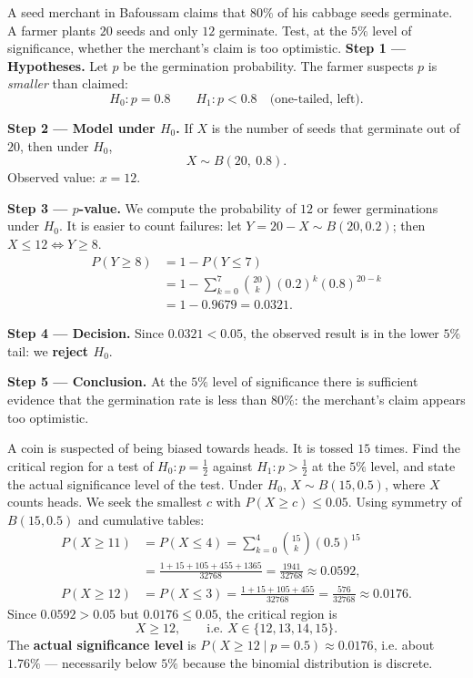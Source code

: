 \documentclass[11pt]{article}
\begin{document}
\begin{exoresolu}
A seed merchant in Bafoussam claims that $80\%$ of his cabbage seeds germinate. A farmer plants $20$ seeds and only $12$ germinate. Test, at the $5\%$ level of significance, whether the merchant's claim is too optimistic.
\tcblower
\textbf{Step 1 --- Hypotheses.} Let $p$ be the germination probability. The farmer suspects $p$ is \emph{smaller} than claimed:
\[ H_0 : p = 0.8 \qquad H_1 : p < 0.8 \quad \text{(one-tailed, left)}. \]

\textbf{Step 2 --- Model under $H_0$.} If $X$ is the number of seeds that germinate out of $20$, then under $H_0$,
\[ X \sim B(20,\ 0.8). \]
Observed value: $x = 12$.

\textbf{Step 3 --- $p$-value.} We compute the probability of $12$ or fewer germinations under $H_0$. It is easier to count failures: let $Y = 20 - X \sim B(20, 0.2)$; then $X \le 12 \iff Y \ge 8$.
\begin{align*}
P(Y \ge 8) &= 1 - P(Y \le 7) \\
&= 1 - \sum_{k=0}^{7} \binom{20}{k}(0.2)^k(0.8)^{20-k} \\
&= 1 - 0.9679 = 0.0321.
\end{align*}

\textbf{Step 4 --- Decision.} Since $0.0321 < 0.05$, the observed result is in the lower $5\%$ tail: we \textbf{reject $H_0$}.

\textbf{Step 5 --- Conclusion.} At the $5\%$ level of significance there is sufficient evidence that the germination rate is less than $80\%$: the merchant's claim appears too optimistic.
\end{exoresolu}

\begin{exoresolu}
A coin is suspected of being biased towards heads. It is tossed $15$ times. Find the critical region for a test of $H_0 : p = \tfrac12$ against $H_1 : p > \tfrac12$ at the $5\%$ level, and state the actual significance level of the test.
\tcblower
Under $H_0$, $X \sim B(15, 0.5)$, where $X$ counts heads. We seek the smallest $c$ with $P(X \ge c) \le 0.05$. Using symmetry of $B(15, 0.5)$ and cumulative tables:
\begin{align*}
P(X \ge 11) &= P(X \le 4) = \sum_{k=0}^{4}\binom{15}{k}(0.5)^{15} \\
&= \frac{1 + 15 + 105 + 455 + 1365}{32768} = \frac{1941}{32768} \approx 0.0592, \\
P(X \ge 12) &= P(X \le 3) = \frac{1 + 15 + 105 + 455}{32768} = \frac{576}{32768} \approx 0.0176.
\end{align*}
Since $0.0592 > 0.05$ but $0.0176 \le 0.05$, the critical region is
\[ X \ge 12, \qquad \text{i.e. } X \in \{12, 13, 14, 15\}. \]
The \textbf{actual significance level} is $P(X \ge 12 \mid p = 0.5) \approx 0.0176$, i.e. about $1.76\%$ --- necessarily below $5\%$ because the binomial distribution is discrete.
\end{exoresolu}
\end{document}
